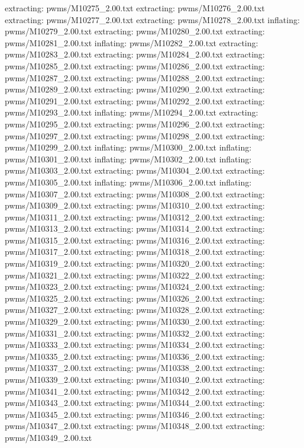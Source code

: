 \documentclass[letterpaper,10pt,english]{sphinxmanual}
\begin{document}
{\begin{sphinxVerbatim}[commandchars=\\\{\}]
 extracting: pwms/M10275\_2.00.txt
 extracting: pwms/M10276\_2.00.txt
 extracting: pwms/M10277\_2.00.txt
 extracting: pwms/M10278\_2.00.txt
  inflating: pwms/M10279\_2.00.txt
 extracting: pwms/M10280\_2.00.txt
 extracting: pwms/M10281\_2.00.txt
  inflating: pwms/M10282\_2.00.txt
 extracting: pwms/M10283\_2.00.txt
 extracting: pwms/M10284\_2.00.txt
 extracting: pwms/M10285\_2.00.txt
 extracting: pwms/M10286\_2.00.txt
 extracting: pwms/M10287\_2.00.txt
 extracting: pwms/M10288\_2.00.txt
 extracting: pwms/M10289\_2.00.txt
 extracting: pwms/M10290\_2.00.txt
 extracting: pwms/M10291\_2.00.txt
 extracting: pwms/M10292\_2.00.txt
 extracting: pwms/M10293\_2.00.txt
  inflating: pwms/M10294\_2.00.txt
 extracting: pwms/M10295\_2.00.txt
 extracting: pwms/M10296\_2.00.txt
 extracting: pwms/M10297\_2.00.txt
 extracting: pwms/M10298\_2.00.txt
 extracting: pwms/M10299\_2.00.txt
  inflating: pwms/M10300\_2.00.txt
  inflating: pwms/M10301\_2.00.txt
  inflating: pwms/M10302\_2.00.txt
  inflating: pwms/M10303\_2.00.txt
 extracting: pwms/M10304\_2.00.txt
 extracting: pwms/M10305\_2.00.txt
  inflating: pwms/M10306\_2.00.txt
  inflating: pwms/M10307\_2.00.txt
 extracting: pwms/M10308\_2.00.txt
 extracting: pwms/M10309\_2.00.txt
 extracting: pwms/M10310\_2.00.txt
 extracting: pwms/M10311\_2.00.txt
 extracting: pwms/M10312\_2.00.txt
 extracting: pwms/M10313\_2.00.txt
 extracting: pwms/M10314\_2.00.txt
 extracting: pwms/M10315\_2.00.txt
 extracting: pwms/M10316\_2.00.txt
 extracting: pwms/M10317\_2.00.txt
 extracting: pwms/M10318\_2.00.txt
 extracting: pwms/M10319\_2.00.txt
 extracting: pwms/M10320\_2.00.txt
 extracting: pwms/M10321\_2.00.txt
 extracting: pwms/M10322\_2.00.txt
 extracting: pwms/M10323\_2.00.txt
 extracting: pwms/M10324\_2.00.txt
 extracting: pwms/M10325\_2.00.txt
 extracting: pwms/M10326\_2.00.txt
 extracting: pwms/M10327\_2.00.txt
 extracting: pwms/M10328\_2.00.txt
 extracting: pwms/M10329\_2.00.txt
 extracting: pwms/M10330\_2.00.txt
 extracting: pwms/M10331\_2.00.txt
 extracting: pwms/M10332\_2.00.txt
 extracting: pwms/M10333\_2.00.txt
 extracting: pwms/M10334\_2.00.txt
 extracting: pwms/M10335\_2.00.txt
 extracting: pwms/M10336\_2.00.txt
 extracting: pwms/M10337\_2.00.txt
 extracting: pwms/M10338\_2.00.txt
 extracting: pwms/M10339\_2.00.txt
 extracting: pwms/M10340\_2.00.txt
 extracting: pwms/M10341\_2.00.txt
 extracting: pwms/M10342\_2.00.txt
 extracting: pwms/M10343\_2.00.txt
 extracting: pwms/M10344\_2.00.txt
 extracting: pwms/M10345\_2.00.txt
 extracting: pwms/M10346\_2.00.txt
 extracting: pwms/M10347\_2.00.txt
 extracting: pwms/M10348\_2.00.txt
 extracting: pwms/M10349\_2.00.txt

\end{sphinxVerbatim}}
\end{document}
